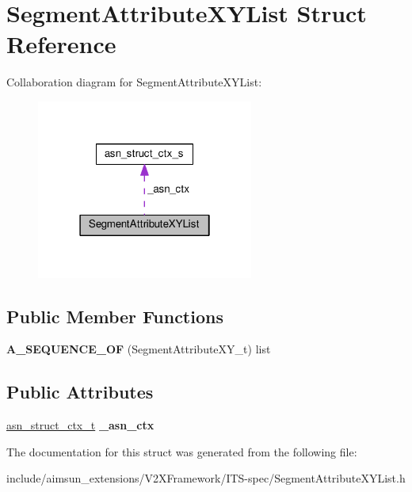 \hypertarget{structSegmentAttributeXYList}{}\section{Segment\+Attribute\+X\+Y\+List Struct Reference}
\label{structSegmentAttributeXYList}


Collaboration diagram for Segment\+Attribute\+X\+Y\+List\+:\nopagebreak
\begin{figure}[H]
\begin{center}
\leavevmode
\includegraphics[width=202pt]{structSegmentAttributeXYList__coll__graph}
\end{center}
\end{figure}
\subsection*{Public Member Functions}
\begin{DoxyCompactItemize}
\item 
{\bfseries A\+\_\+\+S\+E\+Q\+U\+E\+N\+C\+E\+\_\+\+OF} (Segment\+Attribute\+X\+Y\+\_\+t) list\hypertarget{structSegmentAttributeXYList_af98d78c94465defa7cecbf67a2f5b712}{}\label{structSegmentAttributeXYList_af98d78c94465defa7cecbf67a2f5b712}

\end{DoxyCompactItemize}
\subsection*{Public Attributes}
\begin{DoxyCompactItemize}
\item 
\hyperlink{structasn__struct__ctx__s}{asn\+\_\+struct\+\_\+ctx\+\_\+t} {\bfseries \+\_\+asn\+\_\+ctx}\hypertarget{structSegmentAttributeXYList_a784696176433a0470a080e88154e637d}{}\label{structSegmentAttributeXYList_a784696176433a0470a080e88154e637d}

\end{DoxyCompactItemize}


The documentation for this struct was generated from the following file\+:\begin{DoxyCompactItemize}
\item 
include/aimsun\+\_\+extensions/\+V2\+X\+Framework/\+I\+T\+S-\/spec/Segment\+Attribute\+X\+Y\+List.\+h\end{DoxyCompactItemize}
